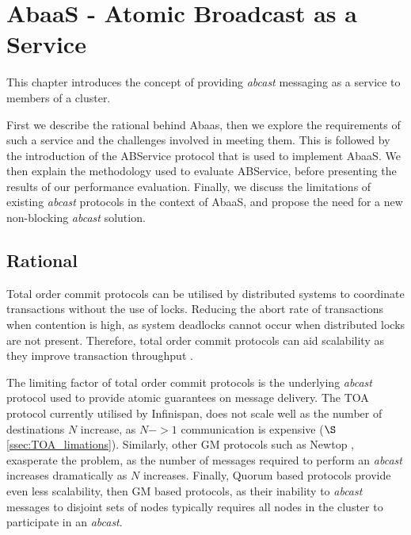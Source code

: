 \chapter{AbaaS - Atomic Broadcast as a Service}

\ifpdf
    \graphicspath{{Chapter3-TxService/Figs/Raster/}{Chapter3-TxService/Figs/PDF/}{Chapter3-TxService/Figs/}}
\else
    \graphicspath{{Chapter3-TxService/Figs/Vector/}{Chapter3-TxService/Figs/}}
\fi


This chapter introduces the concept of providing \emph{abcast} messaging as a service to members of a cluster.

First we describe the rational behind \textsf{Abaas}, then we explore the requirements of such a service and the challenges involved in meeting them.  This is followed by the introduction of the \textsf{ABService} protocol that is used to implement \textsf{AbaaS}.  We then explain the methodology used to evaluate \textsf{ABService}, before presenting the results of our performance evaluation.  Finally, we discuss the limitations of existing \emph{abcast} protocols in the context of \textsf{AbaaS}, and propose the need for a new non-blocking \emph{abcast} solution.  

\section{Rational}
Total order commit protocols can be utilised by distributed systems to coordinate transactions without the use of locks.  Reducing the abort rate of transactions when contention is high, as system deadlocks cannot occur when distributed locks are not present.  Therefore, total order commit protocols can aid scalability as they improve transaction throughput \citep{Ruivo:2011:ETO:2120967.2121604}.  

The limiting factor of total order commit protocols is the underlying \emph{abcast} protocol used to provide atomic guarantees on message delivery.  The TOA protocol currently utilised by Infinispan, does not scale well as the number of destinations $N$ increase, as $N->1$ communication is expensive ($\S$ \ref{ssec:TOA_limations}).  Similarly, other GM protocols such as Newtop \citep{Ezhilchelvan:1995:NFG:876885.880005}, exasperate the problem, as the number of messages required to perform an \emph{abcast} increases dramatically as $N$ increases.  Finally, Quorum based protocols provide even less scalability, then GM based protocols, as their inability to \emph{abcast} messages to disjoint sets of nodes typically requires all nodes in the cluster to participate in an \emph{abcast}.  

